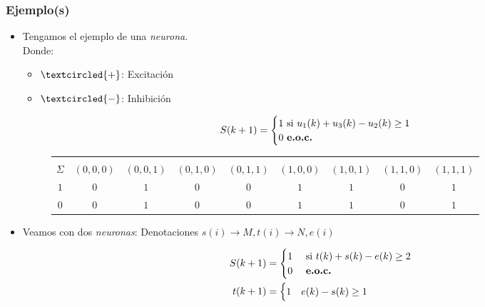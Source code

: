 \subsubsection{Ejemplo(s)}
\begin{itemize}
\item Tengamos el ejemplo de una \textit{neurona}. \\
Donde:
\begin{itemize}
\item $\textcircled{{\scriptsize +}}$: Excitación
\item $\textcircled{-}$: Inhibición
\end{itemize}
\begin{figure}[ht!]
\centering
{}
\end{figure}
$$S(k+1)=
\begin{cases}
1 \text{ si } u_1(k) +u_3(k) - u_2(k) \geq 1 \\
0 \text{ \textbf{e.o.c.} }
\end{cases}
$$
\begin{figure}[ht!]
\centering
\begin{tabular}{|c|cccccccc|}
    \hline
    \backslashbox{$k$}{\vspace{0.1pt}\\$\Sigma$} & $(0,0,0)$ & $(0,0,1)$ & $(0,1,0)$ & $(0,1,1)$ & $(1,0,0)$ & $(1,0,1)$ & $(1,1,0)$ & $(1,1,1)$\\ \hline
                $1$ & $0$ & $1$  & $0$ & $0$ & $1$ & $1$ & $0$ & $1$ \\ 
                $0$ & $0$ & $1$  & $0$ & $0$ & $1$ & $1$ & $0$ & $1$ \\ \hline
\end{tabular} 
\end{figure}
\item Veamos con dos \textit{neuronas}: Denotaciones $s(i) \rightarrow M , t(i) \rightarrow N,e(i)$
\begin{figure}[ht!]
\centering
{}
\end{figure}
\begin{align*}
S(k+1) &=  
\begin{cases}
1 & \text{ si } t(k) +s(k) - e(k) \geq 2 \\
0 & \text{ \textbf{e.o.c.} }
\end{cases} \\
t(k+1) &=
\begin{cases}
1 & e(k)-s(k) \geq 1 \\

\end{cases}
\end{align*}
\end{itemize}
